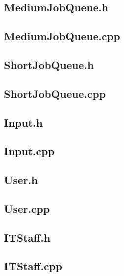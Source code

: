 \documentclass [10 pt, a4 paper]{report}
\begin{document}
\subsection{MediumJobQueue.h}

\subsection{MediumJobQueue.cpp}


\subsection{ShortJobQueue.h}

\subsection{ShortJobQueue.cpp}


\subsection{Input.h}

\subsection{Input.cpp}


\subsection{User.h}

\subsection{User.cpp}


\subsection{ITStaff.h}

\subsection{ITStaff.cpp}

\end{document}

